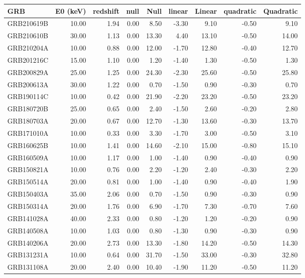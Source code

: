 \begin{tabular}{lrrrrrrrr}
\toprule
GRB & E0 (keV) & redshift & null & Null & linear & Linear & quadratic & Quadratic \\
\midrule
GRB210619B & 10.00 & 1.94 & 0.00 & 8.50 & -3.30 & 9.10 & -0.50 & 9.10 \\
GRB210610B & 30.00 & 1.13 & 0.00 & 13.30 & 4.40 & 13.10 & -0.50 & 14.00 \\
GRB210204A & 10.00 & 0.88 & 0.00 & 12.00 & -1.70 & 12.80 & -0.40 & 12.70 \\
GRB201216C & 15.00 & 1.10 & 0.00 & 1.20 & -1.40 & 1.30 & -0.50 & 1.30 \\
GRB200829A & 25.00 & 1.25 & 0.00 & 24.30 & -2.30 & 25.60 & -0.50 & 25.80 \\
GRB200613A & 30.00 & 1.22 & 0.00 & 0.70 & -1.50 & 0.90 & -0.30 & 0.70 \\
GRB190114C & 10.00 & 0.42 & 0.00 & 21.90 & -2.20 & 23.20 & -0.50 & 23.20 \\
GRB180720B & 25.00 & 0.65 & 0.00 & 2.40 & -1.50 & 2.60 & -0.20 & 2.80 \\
GRB180703A & 20.00 & 0.67 & 0.00 & 12.70 & -1.30 & 13.60 & -0.30 & 13.70 \\
GRB171010A & 10.00 & 0.33 & 0.00 & 3.30 & -1.70 & 3.00 & -0.50 & 3.10 \\
GRB160625B & 10.00 & 1.41 & 0.00 & 14.60 & -2.10 & 15.00 & -0.80 & 15.10 \\
GRB160509A & 10.00 & 1.17 & 0.00 & 1.00 & -1.40 & 0.90 & -0.40 & 0.90 \\
GRB150821A & 10.00 & 0.76 & 0.00 & 2.20 & -1.20 & 2.40 & -0.30 & 2.20 \\
GRB150514A & 20.00 & 0.81 & 0.00 & 1.00 & -1.40 & 0.90 & -0.40 & 1.90 \\
GRB150403A & 35.00 & 2.06 & 0.00 & 0.70 & -1.50 & 0.90 & -0.30 & 0.90 \\
GRB150314A & 20.00 & 1.76 & 0.00 & 6.90 & -1.70 & 7.30 & -0.70 & 7.60 \\
GRB141028A & 40.00 & 2.33 & 0.00 & 0.80 & -1.20 & 1.20 & -0.20 & 0.90 \\
GRB140508A & 10.00 & 1.03 & 0.00 & 0.80 & -1.30 & 0.90 & -0.30 & 0.90 \\
GRB140206A & 20.00 & 2.73 & 0.00 & 13.30 & -1.80 & 14.20 & -0.50 & 14.30 \\
GRB131231A & 10.00 & 0.64 & 0.00 & 31.70 & -1.50 & 33.00 & -0.30 & 32.80 \\
GRB131108A & 20.00 & 2.40 & 0.00 & 10.40 & -1.90 & 11.20 & -0.50 & 11.20 \\

\end{tabular}
